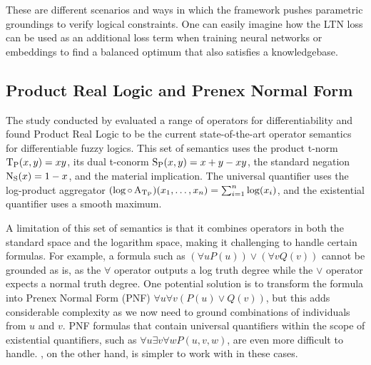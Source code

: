 These are different scenarios and ways in which the framework pushes parametric groundings to verify logical constraints.
One can easily imagine how the LTN loss can be used as an additional loss term when training neural networks or embeddings to find a balanced optimum that also satisfies a knowledgebase.


\subsection{Product Real Logic and Prenex Normal Form}
\label{appendix:prodrl_and_pnf}
The study conducted by \cite{van_krieken_analyzing_2022} evaluated a range of operators for differentiability and found Product Real Logic to be the current state-of-the-art operator semantics for differentiable fuzzy logics.
This set of semantics uses the product t-norm $\operatorname{T_{P}}(x,y)=xy$, its dual t-conorm $\operatorname{S_{P}}(x,y)=x+y-xy$, the standard negation $\operatorname{N_{S}}(x)=1-x$, and the material implication.
The universal quantifier uses the log-product aggregator $(\log \circ \operatorname{A_{\operatorname{T_{P}}}})(x_1,\dotsc,x_n) = \sum_{i=1}^{n} \log(x_i)$,
and the existential quantifier uses a smooth maximum.

A limitation of this set of semantics is that it combines operators in both the standard space and the logarithm space, making it challenging to handle certain formulas. 
For example, a formula such as $(\forall u P(u)) \lor (\forall v Q(v))$ cannot be grounded as is, as the $\forall$ operator outputs a log truth degree while the $\lor$ operator expects a normal truth degree. 
One potential solution is to transform the formula into Prenex Normal Form (PNF) $\forall u \forall v (P(u) \lor Q(v))$, but this adds considerable complexity as we now need to ground combinations of individuals from $u$ and $v$. 
PNF formulas that contain universal quantifiers within the scope of existential quantifiers, such as $\forall u \exists v \forall w P(u,v,w)$, are even more difficult to handle. 
\logLTN, on the other hand, is simpler to work with in these cases.

